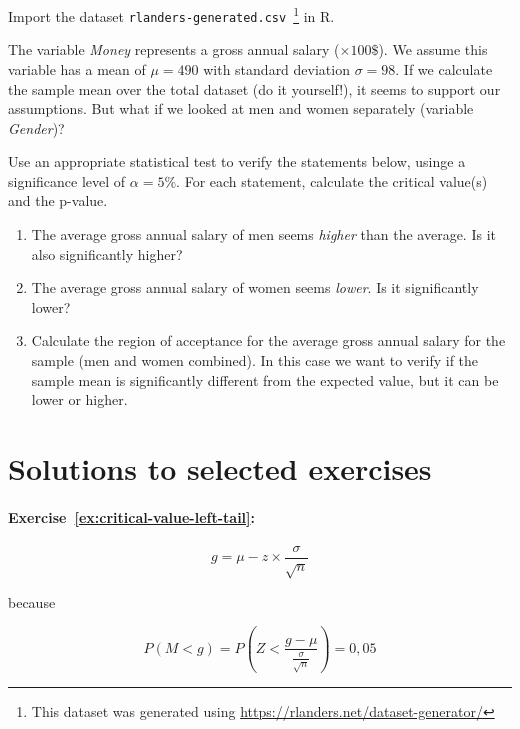 \begin{exercise}
  \label{ex:z-test-rlanders}
  Import the dataset \texttt{rlanders-generated.csv}~\footnote{This dataset was generated using \url{https://rlanders.net/dataset-generator/}} in R.
  
  The variable \emph{Money} represents a gross annual salary ($\times 100\$$). We assume this variable has a mean of $\mu = 490$ with standard deviation $\sigma = 98$. If we calculate the sample mean over the total dataset (do it yourself!), it seems to support our assumptions. But what if we looked at men and women separately (variable \emph{Gender})?
  
  Use an appropriate statistical test to verify the statements below, usinge a significance level of $\alpha = 5\%$.
  For each statement, calculate the critical value(s) and the p-value.
  
  \begin{enumerate}
    \item The average gross annual salary of men seems \emph{higher} than the average. Is it also significantly higher?
    \item The average gross annual salary of women seems \emph{lower}. Is it significantly lower?
    \item Calculate the region of acceptance for the average gross annual salary for the sample (men and women combined). In this case we want to verify if the sample mean is significantly different from the expected value, but it can be lower or higher.
  \end{enumerate}
  
\end{exercise}

\section{Solutions to selected exercises}
\label{sec:testing-procedures-solutions}

\paragraph{Exercise~\ref{ex:critical-value-left-tail}:}

\begin{equation}
g = \mu - z \times \frac{\sigma}{\sqrt{n}}
\label{eq:kritiekeRechtseWaarde2}
\end{equation}

because

\[ P(M < g) = P\left(Z < \frac{g - \mu}{\frac{\sigma}{\sqrt{n}}}\right) = 0,05 \]

